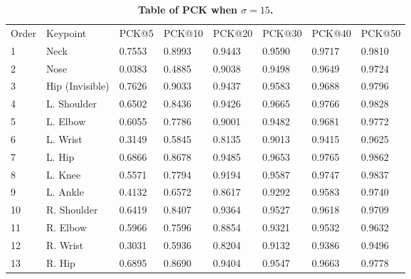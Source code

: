 \documentclass[10pt,letterpaper]{article}
\newlength\savedwidth
\newcommand\thickhline{\noalign{\global\savedwidth\arrayrulewidth\global\arrayrulewidth 2pt}%
	\hline
	\noalign{\global\arrayrulewidth\savedwidth}}
\begin{document}
	
\begin{table}[!ht]
\begin{adjustwidth}{-2.25in}{0in} %
	\centering
	\caption{
		{\bf Table of PCK when $\sigma=15$.}}
	\begin{tabular}{|l|l|l|l|l|l|l|l|}
		\hline
		Order & Keypoint & PCK@5 & PCK@10 & PCK@20 & PCK@30 & PCK@40 & PCK@50 \\ \thickhline
		1     &  Neck       & 0.7553      &  0.8993      &  0.9443      & 0.9590       &   0.9717     & 0.9810       \\ \hline
		2     &  Nose        & 0.0383      &  0.4885      &  0.9038      &  0.9498      &   0.9649     & 0.9724        \\ \hline
		3     &  Hip (Invisible)        & 0.7626      &  0.9033      &  0.9437      & 0.9583       &  0.9688      & 0.9796       \\ \hline
		4     &  L. Shoulder         & 0.6502      & 0.8436       & 0.9426       & 0.9665       &  0.9766      & 0.9828       \\ \hline
		5     &  L. Elbow        & 0.6055      &  0.7786      &  0.9001      &  0.9482      &  0.9681      &  0.9772      \\ \hline
		6     &  L. Wrist        & 0.3149      &  0.5845      &  0.8135      &  0.9013      &  0.9415      &  0.9625      \\ \hline
		7     &  L. Hip        &  0.6866     &   0.8678     &  0.9485      & 0.9653       &  0.9765      &  0.9862      \\ \hline
		8     &  L. Knee         & 0.5571      &  0.7794      &  0.9194      & 0.9587       &  0.9747      &  0.9837      \\ \hline
		9     &  L. Ankle         &  0.4132     &  0.6572      &   0.8617     &   0.9292     &  0.9583      & 0.9740       \\ \hline
		10    &  R. Shoulder        & 0.6419      &  0.8407      &  0.9364      & 0.9527       & 0.9618       &  0.9709      \\ \hline
		11    &  R. Elbow        & 0.5966      &  0.7596      &  0.8854      &  0.9321      &  0.9532      &  0.9632      \\ \hline
		12    &  R. Wrist        & 0.3031      &  0.5936      &  0.8204      &  0.9132      &  0.9386      &  0.9496      \\ \hline
		13    &  R. Hip        & 0.6895      &   0.8690     &  0.9404      &  0.9547      &    0.9663    &   0.9778     \\ \hline

\end{tabular}
\end{adjustwidth}
\end{table}
\end{document}
